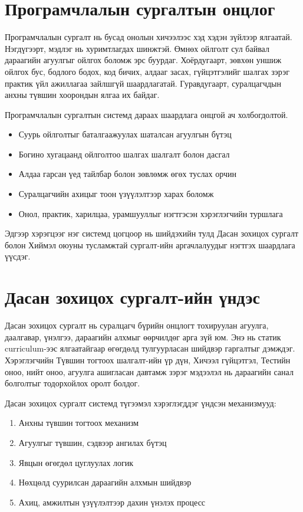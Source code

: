 \section{Програмчлалын сургалтын онцлог}
Програмчлалын сургалт нь бусад онолын хичээлээс хэд хэдэн зүйлээр ялгаатай. Нэгдүгээрт, мэдлэг нь хуримтлагдах шинжтэй. Өмнөх ойлголт сул байвал дараагийн агуулгыг ойлгох боломж эрс буурдаг. Хоёрдугаарт, зөвхөн уншиж ойлгох бус, бодлого бодох, код бичих, алдааг засах, гүйцэтгэлийг шалгах зэрэг практик үйл ажиллагаа зайлшгүй шаардлагатай. Гуравдугаарт, суралцагчдын анхны түвшин хоорондын ялгаа их байдаг.

Програмчлалын сургалтын системд дараах шаардлага онцгой ач холбогдолтой.
\begin{itemize}
\item Суурь ойлголтыг баталгаажуулах шаталсан агуулгын бүтэц
\item Богино хугацаанд ойлголтоо шалгах шалгалт болон дасгал
\item Алдаа гарсан үед тайлбар болон зөвлөмж өгөх туслах орчин
\item Суралцагчийн ахицыг тоон үзүүлэлтээр харах боломж
\item Онол, практик, харилцаа, урамшууллыг нэгтгэсэн хэрэглэгчийн туршлага
\end{itemize}

Эдгээр хэрэгцээг нэг системд цогцоор нь шийдэхийн тулд Дасан зохицох сургалт болон Хиймэл оюуны тусламжтай сургалт-ийн аргачлалуудыг нэгтгэх шаардлага үүсдэг.

\section{Дасан зохицох сургалт-ийн үндэс}
Дасан зохицох сургалт нь суралцагч бүрийн онцлогт тохируулан агуулга, даалгавар, үнэлгээ, дараагийн алхмыг өөрчилдөг арга зүй юм. Энэ нь статик curriculum-ээс ялгаатайгаар өгөгдөлд тулгуурласан шийдвэр гаргалтыг дэмждэг. Хэрэглэгчийн Түвшин тогтоох шалгалт-ийн үр дүн, Хичээл гүйцэтгэл, Тестийн оноо, нийт оноо, агуулга ашигласан давтамж зэрэг мэдээлэл нь дараагийн санал болголтыг тодорхойлох оролт болдог.

Дасан зохицох сургалт системд түгээмэл хэрэглэгддэг үндсэн механизмууд:
\begin{enumerate}
\item Анхны түвшин тогтоох механизм
\item Агуулгыг түвшин, сэдвээр ангилах бүтэц
\item Явцын өгөгдөл цуглуулах логик
\item Нөхцөлд суурилсан дараагийн алхмын шийдвэр
\item Ахиц, амжилтын үзүүлэлтээр дахин үнэлэх процесс
\end{enumerate}

